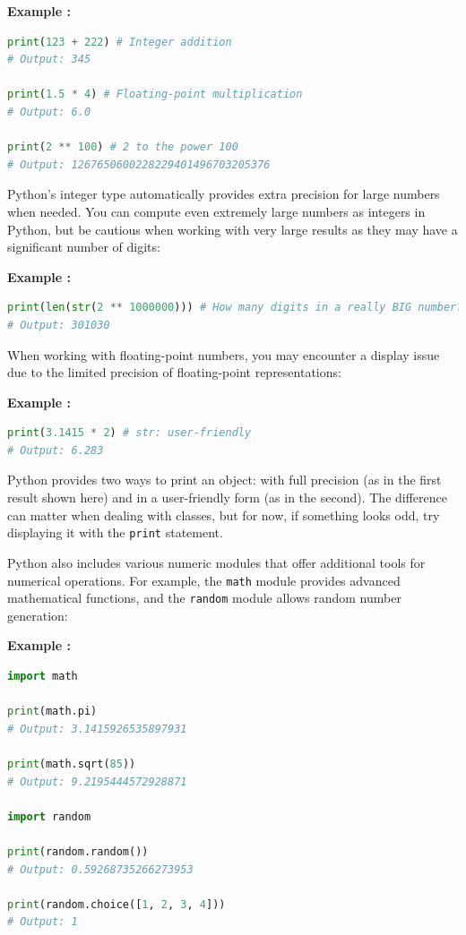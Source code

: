 \documentclass[12pt]{book}
\newtheorem{Example}{Example}[chapter]
\renewenvironment{Example}{\begin{trivlist}\item\relax
\textbf{Example \thesection: }}{\end{trivlist}}
\begin{document}
\begin{Example}
\begin{lstlisting}[language=Python]
print(123 + 222) # Integer addition
# Output: 345

print(1.5 * 4) # Floating-point multiplication
# Output: 6.0

print(2 ** 100) # 2 to the power 100
# Output: 1267650600228229401496703205376
\end{lstlisting}
\end{Example}

Python's integer type automatically provides extra precision for large numbers when needed. You can compute even extremely large numbers as integers in Python, but be cautious when working with very large results as they may have a significant number of digits:

\begin{Example}
\begin{lstlisting}[language=Python]
print(len(str(2 ** 1000000))) # How many digits in a really BIG number?
# Output: 301030
\end{lstlisting}
\end{Example}

When working with floating-point numbers, you may encounter a display issue due to the limited precision of floating-point representations:

\begin{Example}
\begin{lstlisting}[language=Python]
print(3.1415 * 2) # str: user-friendly
# Output: 6.283
\end{lstlisting}
\end{Example}

Python provides two ways to print an object: with full precision (as in the first result shown here) and in a user-friendly form (as in the second). The difference can matter when dealing with classes, but for now, if something looks odd, try displaying it with the \texttt{print} statement.

Python also includes various numeric modules that offer additional tools for numerical operations. For example, the \texttt{math} module provides advanced mathematical functions, and the \texttt{random} module allows random number generation:

\begin{Example}
\begin{lstlisting}[language=Python]
import math

print(math.pi)
# Output: 3.1415926535897931

print(math.sqrt(85))
# Output: 9.2195444572928871

import random

print(random.random())
# Output: 0.59268735266273953

print(random.choice([1, 2, 3, 4]))
# Output: 1
\end{lstlisting}
\end{Example}
\end{document}
